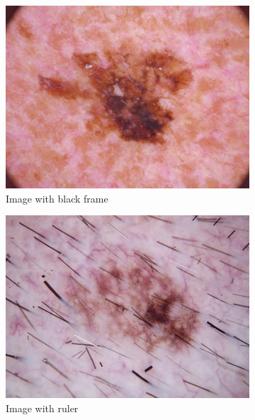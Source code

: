\documentclass[11pt,a4paper]{article}
\begin{document}
\begin{figure}[ht]
    \begin{center}
        \begin{subfigure}[b]{0.3\textwidth}
            \includegraphics[width=\textwidth]{./images/ISIC_0024310.jpg}
            \caption{Image with black frame}
        \end{subfigure}
        \begin{subfigure}[b]{0.3\textwidth}
            \includegraphics[width=\textwidth]{./images/ISIC_0024420.jpg}
            \caption{Image with ruler}
        \end{subfigure}
        \begin{subfigure}[b]{0.3\textwidth}

\end{subfigure}
\end{center}
\end{figure}
\end{document}
